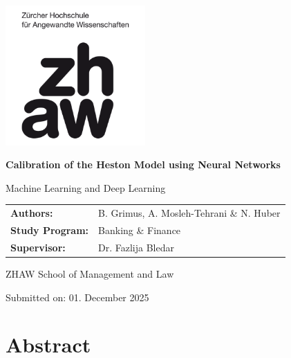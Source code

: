 \documentclass[12pt,a4paper]{article}
\begin{document}
\begin{titlepage}
	\centering
	\includegraphics[width=0.4\textwidth]{images/zhaw_logo.png}
	\vfill
	{\Huge\bfseries Calibration of the Heston Model using Neural Networks\par}
	\vspace{1.0cm}
	{\Large Machine Learning and Deep Learning\par}
	\vspace{1.0cm}
	\vfill
	\begin{minipage}{0.8\textwidth}
		\large
		\begin{tabular}{@{}ll}
			\textbf{Authors:}       & B. Grimus, A. Mosleh-Tehrani \& N. Huber \\
			\textbf{Study Program:} & Banking \& Finance                                        \\
			\textbf{Supervisor:}    & Dr. Fazlija Bledar                                        \\
		\end{tabular}
	\end{minipage}
	\vfill
	{\large
		ZHAW School of Management and Law\par
		Submitted on: 01. December 2025\par
	}
\end{titlepage}
\clearpage

\section*{Abstract}

\clearpage

\tableofcontents
\clearpage
\newpage

\printacronyms
\newpage

\listoffigures
\newpage

\listoftables
\newpage

\end{document}
